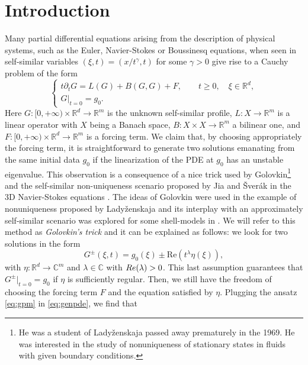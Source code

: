 \documentclass[11pt,reqno]{amsproc}
\def\de{{\partial}}
\def\RR {\mathbb{R}}
\def\Re{{\rm Re}}
\theoremstyle{definition}
\theoremstyle{definition}
\numberwithin{equation}{section}
\begin{document}
\section{Introduction}
Many partial differential equations arising from the description of physical systems, such as the Euler, Navier-Stokes or Boussinesq equations, when seen in self-similar variables $(\xi,t)=(x/t^{\gamma},t)$ for some $\gamma>0$ give rise to a Cauchy problem of the form 
\begin{equation}
\label{eq:genpde}
    \begin{cases}
        t\de_t G=L(G)+B(G,G)+F, \qquad t\geq 0, \quad \xi\in \RR^d,\\
        G|_{t=0}=g_0.
        \end{cases}
\end{equation}
Here $G:[0,+\infty)\times \RR^d\to \RR^m$ is the unknown self-similar profile, $L:X\to \mathbb{R}^m$ is a linear operator with $X$ being a Banach space, $B:X\times X\to \mathbb{R}^m$ a bilinear one, and $F:[0,+\infty)\times \RR^d\to \RR^m$ is a forcing term. We claim that, by choosing appropriately the forcing term, it is straightforward to generate two solutions emanating from the same initial data $g_0$ if the linearization of the PDE at $g_0$ has an unstable eigenvalue. This  observation is a consequence of a nice trick used by Golovkin\footnote{He was a student of Lady\v{z}enskaja \cite{ladyzhenskaya1971kirill} passed away prematurely in the 1969. He was interested in the study of nonuniqueness of stationary states in fluids with given boundary conditions.} \cite{golovkin1964nonuniqueness,golovkin1965examples} and the self-similar non-uniqueness scenario proposed by Jia and \v{S}ver\'{a}k in the 3D Navier-Stokes equations \cite{jia2015incompressible}. The ideas of Golovkin were used in the example of nonuniqueness proposed by  Lady\v{z}enskaja  \cite{ladyvzenskaja1969example} and its interplay with an approximately self-similar scenario was explored for some shell-models in \cite{filonov2021nonuniqueness}. We will refer to this method as \textit{Golovkin's trick} and it can be explained as follows: we look for two solutions in the form
\begin{equation}
   \label{eq:gpm}
    G^\pm(\xi,t)=g_0(\xi)\pm \mathrm{Re}(t^\lambda \eta(\xi)),
\end{equation}
with $\eta:\mathbb{R}^d\to \mathbb{C}^m$ and $\lambda\in \mathbb{C}$ with $\Re(\lambda)>0$. This last assumption guarantees that $G^\pm|_{t=0}=g_0$ if $\eta$ is sufficiently regular. Then, we still have the freedom of choosing the forcing term $F$ and the equation satisfied by $\eta$. Plugging the ansatz \cref{eq:gpm} in \cref{eq:genpde}, we find that 
\end{document}
